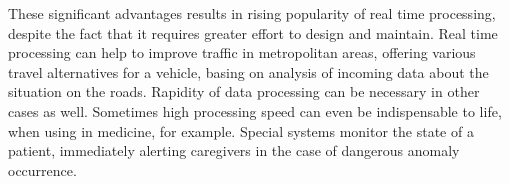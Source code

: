 These significant advantages results in rising popularity of real time processing, despite the fact that it requires greater effort to design and maintain.
Real time processing can help to improve traffic in metropolitan areas, offering various travel alternatives for a vehicle, basing on analysis of incoming data about the situation on the roads.
Rapidity of data processing can be necessary in other cases as well.
Sometimes high processing speed can even be indispensable to life, when using in medicine, for example.
Special systems monitor the state of a patient, immediately alerting caregivers in the case of dangerous anomaly occurrence. 







